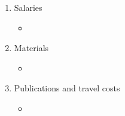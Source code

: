 
\begin{enumerate}
\item Salaries
\begin{itemize}
\item
\end{itemize}
\item Materials
\begin{itemize}
\item
\end{itemize}
\item Publications and travel costs
\begin{itemize}
\item
\end{itemize}
\end{enumerate}
